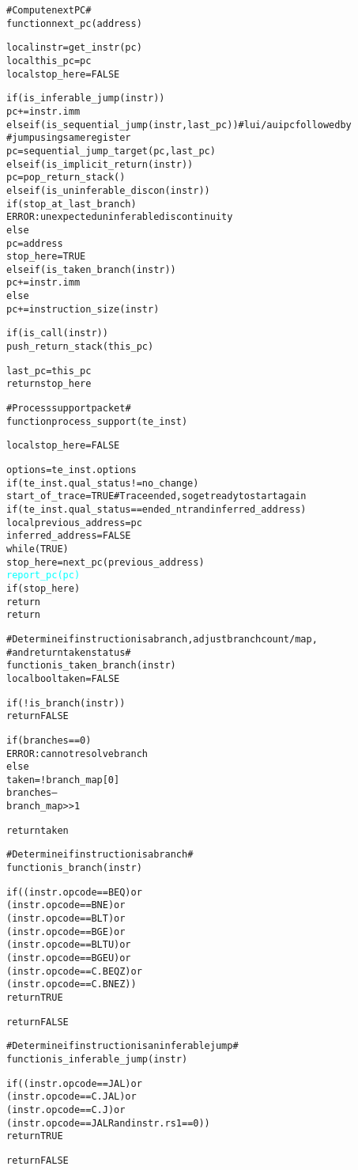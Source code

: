 \begin{alltt}
# Compute next PC #
function next_pc (address)

  local instr     = get_instr(pc)
  local this_pc   = pc
  local stop_here = FALSE

  if (is_inferable_jump(instr))
    pc += instr.imm
  else if (is_sequential_jump(instr, last_pc)) # lui/auipc followed by
                                               #  jump using same register
    pc = sequential_jump_target(pc, last_pc)
  else if (is_implicit_return(instr))
    pc = pop_return_stack()
  else if (is_uninferable_discon(instr))
    if (stop_at_last_branch)
      ERROR: unexpected uninferable discontinuity
    else
      pc        = address
      stop_here = TRUE
  else if (is_taken_branch(instr))
    pc += instr.imm
  else
    pc += instruction_size(instr)

  if (is_call(instr))
    push_return_stack(this_pc)

  last_pc = this_pc
  return stop_here

# Process support packet #
function process_support (te_inst)

  local stop_here = FALSE

  options = te_inst.options
    if (te_inst.qual_status != no_change)
      start_of_trace = TRUE # Trace ended, so get ready to start again
    if (te_inst.qual_status == ended_ntr and inferred_address)
      local previous_address = pc
      inferred_address       = FALSE
      while (TRUE)
        stop_here = next_pc(previous_address)
        \textcolor{cyan}{report_pc(pc)}
        if (stop_here)
          return
    return
\end{alltt}

\pagebreak

\begin{alltt}
# Determine if instruction is a branch, adjust branch count/map,
#   and return taken status #
function is_taken_branch (instr)
  local bool taken = FALSE

  if (!is_branch(instr))
    return FALSE

  if (branches == 0)
    ERROR: cannot resolve branch
  else
    taken = !branch_map[0]
    branches--
    branch_map >> 1

  return taken

# Determine if instruction is a branch #
function is_branch (instr)

  if ((instr.opcode == BEQ)    or
      (instr.opcode == BNE)    or
      (instr.opcode == BLT)    or
      (instr.opcode == BGE)    or
      (instr.opcode == BLTU)   or
      (instr.opcode == BGEU)   or
      (instr.opcode == C.BEQZ) or
      (instr.opcode == C.BNEZ))
    return TRUE

  return FALSE

# Determine if instruction is an inferable jump #
function is_inferable_jump (instr)

  if ((instr.opcode == JAL)   or
      (instr.opcode == C.JAL) or
      (instr.opcode == C.J)   or
      (instr.opcode == JALR and instr.rs1 == 0))
    return TRUE

  return FALSE
\end{alltt}

